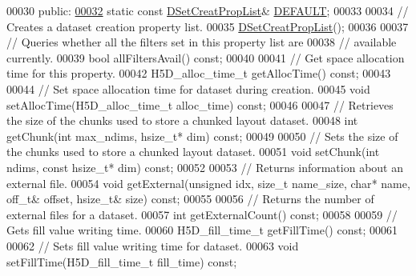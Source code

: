 \begin{DoxyCode}
00030    \textcolor{keyword}{public}:
\hyperlink{class_h5_1_1_d_set_creat_prop_list_aea0be1dc39378736daeac7af787bbc8e}{00032}         \textcolor{keyword}{static} \textcolor{keyword}{const} \hyperlink{class_h5_1_1_d_set_creat_prop_list}{DSetCreatPropList}& \hyperlink{class_h5_1_1_d_set_creat_prop_list_aea0be1dc39378736daeac7af787bbc8e}{DEFAULT};
00033 
00034         \textcolor{comment}{// Creates a dataset creation property list.}
00035         \hyperlink{class_h5_1_1_d_set_creat_prop_list}{DSetCreatPropList}();
00036 
00037         \textcolor{comment}{// Queries whether all the filters set in this property list are}
00038         \textcolor{comment}{// available currently.}
00039         \textcolor{keywordtype}{bool} allFiltersAvail() \textcolor{keyword}{const};
00040 
00041         \textcolor{comment}{// Get space allocation time for this property.}
00042         H5D\_alloc\_time\_t getAllocTime() \textcolor{keyword}{const};
00043 
00044         \textcolor{comment}{// Set space allocation time for dataset during creation.}
00045         \textcolor{keywordtype}{void} setAllocTime(H5D\_alloc\_time\_t alloc\_time) \textcolor{keyword}{const};
00046 
00047         \textcolor{comment}{// Retrieves the size of the chunks used to store a chunked layout dataset.}
00048         \textcolor{keywordtype}{int} getChunk(\textcolor{keywordtype}{int} max\_ndims, hsize\_t* dim) \textcolor{keyword}{const};
00049 
00050         \textcolor{comment}{// Sets the size of the chunks used to store a chunked layout dataset.}
00051         \textcolor{keywordtype}{void} setChunk(\textcolor{keywordtype}{int} ndims, \textcolor{keyword}{const} hsize\_t* dim) \textcolor{keyword}{const};
00052 
00053         \textcolor{comment}{// Returns information about an external file.}
00054         \textcolor{keywordtype}{void} getExternal(\textcolor{keywordtype}{unsigned} idx, \textcolor{keywordtype}{size\_t} name\_size, \textcolor{keywordtype}{char}* name, off\_t& offset, hsize\_t& size) \textcolor{keyword}{const};
00055 
00056         \textcolor{comment}{// Returns the number of external files for a dataset.}
00057         \textcolor{keywordtype}{int} getExternalCount() \textcolor{keyword}{const};
00058 
00059         \textcolor{comment}{// Gets fill value writing time.}
00060         H5D\_fill\_time\_t getFillTime() \textcolor{keyword}{const};
00061 
00062         \textcolor{comment}{// Sets fill value writing time for dataset.}
00063         \textcolor{keywordtype}{void} setFillTime(H5D\_fill\_time\_t fill\_time) \textcolor{keyword}{const};

\end{DoxyCode}
